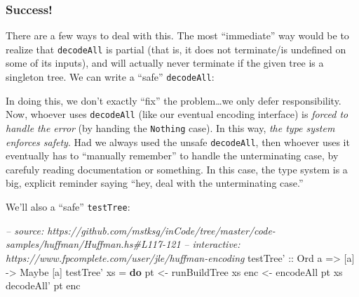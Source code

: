 \documentclass[]{article}
\newenvironment{Shaded}{}{}
\newcommand{\KeywordTok}[1]{\textcolor[rgb]{0.00,0.44,0.13}{\textbf{{#1}}}}
\newcommand{\DataTypeTok}[1]{\textcolor[rgb]{0.56,0.13,0.00}{{#1}}}
\newcommand{\CommentTok}[1]{\textcolor[rgb]{0.38,0.63,0.69}{\textit{{#1}}}}
\newcommand{\OtherTok}[1]{\textcolor[rgb]{0.00,0.44,0.13}{{#1}}}
\newcommand{\FunctionTok}[1]{\textcolor[rgb]{0.02,0.16,0.49}{{#1}}}
\newcommand{\NormalTok}[1]{{#1}}
\begin{document}
\subsubsection{Success!}\label{success}

There are a few ways to deal with this. The most ``immediate'' way would
be to realize that \texttt{decodeAll} is partial (that is, it does not
terminate/is undefined on some of its inputs), and will actually never
terminate if the given tree is a singleton tree. We can write a ``safe''
\texttt{decodeAll}:

\begin{Shaded}
\end{Shaded}

In doing this, we don't exactly ``fix'' the problem\ldots{}we only defer
responsibility. Now, whoever uses \texttt{decodeAll\textquotesingle{}}
(like our eventual encoding interface) is \emph{forced to handle the
error} (by handing the \texttt{Nothing} case). In this way, \emph{the
type system enforces safety}. Had we always used the unsafe
\texttt{decodeAll}, then whoever uses it eventually has to ``manually
remember'' to handle the unterminating case, by carefuly reading
documentation or something. In this case, the type system is a big,
explicit reminder saying ``hey, deal with the unterminating case.''

We'll also a ``safe'' \texttt{testTree}:

\begin{Shaded}
\begin{Highlighting}[]
\CommentTok{-- source: https://github.com/mstksg/inCode/tree/master/code-samples/huffman/Huffman.hs#L117-121}
\CommentTok{-- interactive: https://www.fpcomplete.com/user/jle/huffman-encoding}
\OtherTok{testTree' ::} \DataTypeTok{Ord} \NormalTok{a }\OtherTok{=>} \NormalTok{[a] }\OtherTok{->} \DataTypeTok{Maybe} \NormalTok{[a]}
\NormalTok{testTree' xs }\FunctionTok{=} \KeywordTok{do}
    \NormalTok{pt  }\OtherTok{<-} \NormalTok{runBuildTree xs}
    \NormalTok{enc }\OtherTok{<-} \NormalTok{encodeAll pt xs}
    \NormalTok{decodeAll' pt enc}
\end{Highlighting}
\end{Shaded}
\end{document}
